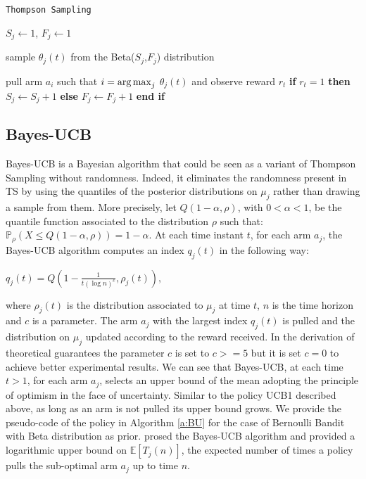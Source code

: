 \begin{algorithm}[H]
	\caption{\texttt{Thompson Sampling}}
	\begin{scriptsize}
		\begin{algorithmic}[1]						
			 
			\State $S_j \gets 1 $, $F_j \gets 1 $
			\EndFor
			 
			
			\State sample $\theta_j(t)$ from the Beta($S_j$,$F_j$) distribution
					
			\EndFor
			\State pull arm $a_i$ such that  $i = \operatorname*{arg\,max}_j$ $\theta_j(t) $ and observe reward ${r_t}$	
			\State 	\textbf{if} $r_t=1$  \textbf{then} $S_j \gets S_j + 1$ \textbf{else}  $F_j \gets F_j + 1$  \textbf{end if}
			
			
			\EndFor	
		\end{algorithmic}
	\end{scriptsize}
	\label{a:TS}
\end{algorithm}


\subsection*{Bayes-UCB}
Bayes-UCB is a Bayesian algorithm  that could be seen as a variant of Thompson Sampling without randomness. Indeed, it eliminates the randomness present in TS by using the quantiles of the posterior distributions on $\mu_j$ rather than drawing a sample from them. More precisely, let $Q(1-\alpha,\rho)$, with $0< \alpha<1$, be the quantile function associated to the distribution $\rho$ such that: $ \mathbb{P}_\rho(X\leq Q(1-\alpha,\rho))=1-\alpha$. At each time instant $t$, for each arm $a_j$, the Bayes-UCB algorithm computes an index $q_j(t)$ in the following way: \begin{center}
$ q_j(t) = Q(1-\frac{1}{t(\log n)^c},\rho_j(t)) ,$
\end{center}where $\rho_j(t)$ is the distribution associated to $\mu_j$ at time $t$, $n$ is the time horizon and $c$ is a parameter. The arm $a_j$ with the largest index $q_j(t)$ is pulled and the distribution on $\mu_j$ updated according to the reward received. In the derivation of theoretical guarantees the parameter $c$ is set to $c>=5$ but it is set $c=0$ to achieve better experimental results. We can see that Bayes-UCB, at each time $t>1$, for each arm $a_j$, selects an upper bound of the mean adopting the principle of optimism in the face of uncertainty. Similar to the policy UCB1 described above, as long as an arm is not pulled its upper bound grows. We provide the pseudo-code of the policy in Algorithm \ref{a:BU} for the case of Bernoulli Bandit with Beta distribution as prior. \cite{kaufmann2012bayesian} prosed the Bayes-UCB algorithm and provided a logarithmic upper bound on $\mathbb{E}[T_j(n)]$, the expected number of times a policy pulls the sub-optimal arm $a_j$ up to time $n$.

